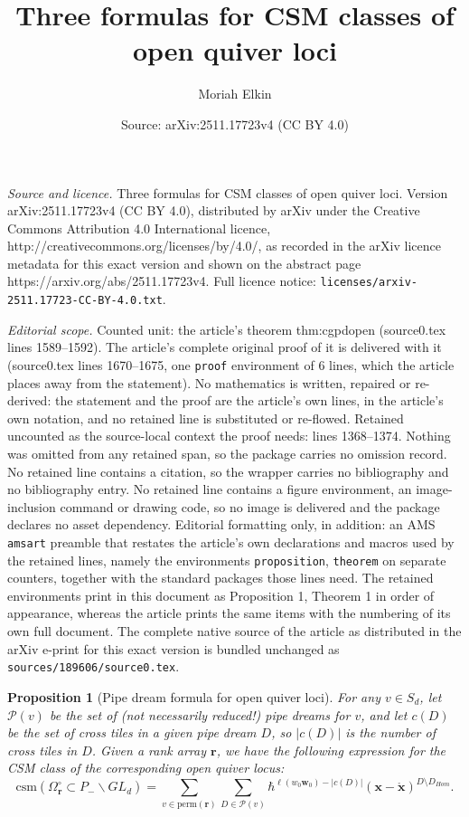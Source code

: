 \documentclass[10pt,a4paper]{amsart}
\title{Three formulas for CSM classes of open quiver loci}
\author{Moriah Elkin}
\date{Source: arXiv:2511.17723v4 (CC BY 4.0)}
\newtheorem{proposition}{Proposition}
\newcommand{\csm}{\textrm{csm}}
\newcommand{\perm}{\textrm{perm}}
\begin{document}
\maketitle

\noindent\emph{Source and licence.} Three formulas for CSM classes of open quiver loci. Version arXiv:2511.17723v4 (CC BY 4.0), distributed by arXiv under the Creative Commons Attribution 4.0 International licence, http://creativecommons.org/licenses/by/4.0/, as recorded in the arXiv licence metadata for this exact version and shown on the abstract page https://arxiv.org/abs/2511.17723v4. Full licence notice: \texttt{licenses/arxiv-2511.17723-CC-BY-4.0.txt}.\par\smallskip

\noindent\textit{Editorial scope.} Counted unit: the article's theorem thm:cgpdopen (source0.tex lines 1589--1592). The article's complete original proof of it is delivered with it (source0.tex lines 1670--1675, one \texttt{proof} environment of 6 lines, which the article places away from the statement). No mathematics is written, repaired or re-derived: the statement and the proof are the article's own lines, in the article's own notation, and no retained line is substituted or re-flowed.  Retained uncounted as the source-local context the proof needs: lines 1368--1374.  Nothing was omitted from any retained span, so the package carries no omission record.  No retained line contains a citation, so the wrapper carries no bibliography and no bibliography entry.  No retained line contains a figure environment, an image-inclusion command or drawing code, so no image is delivered and the package declares no asset dependency.  Editorial formatting only, in addition: an AMS \texttt{amsart} preamble that restates the article's own declarations and macros used by the retained lines, namely the environments \texttt{proposition}, \texttt{theorem} on separate counters, together with the standard packages those lines need.  The retained environments print in this document as Proposition 1, Theorem 1 in order of appearance, whereas the article prints the same items with the numbering of its own full document.  The complete native source of the article as distributed in the arXiv e-print for this exact version is bundled unchanged as \texttt{sources/189606/source0.tex}.
\begin{proposition}[Pipe dream formula for open quiver loci]\label{prop:pdopen}
For any $v \in S_d$, let $\mathcal{P}(v)$ be the set of (not necessarily reduced!) pipe dreams for $v$, and let $c(D)$ be the set of cross tiles in a given pipe dream $D$, so $|c(D)|$ is the number of cross tiles in $D$.
Given a rank array $\mathbf{r}$, we have the following expression for the CSM class of the corresponding open quiver locus:
\[\csm(\Omega_{\mathbf{r}}^\circ \subset P_- \backslash GL_d) =
\sum_{v \in \perm(\mathbf{r})} 
\sum_{D \in \mathcal{P}(v)} \hbar^{\ell(w_0\mathbf{w}_0)-|c(D)|}(\mathbf{x}-\mathring{\mathbf{x}})^{D\setminus D_{Hom}}.\]
\end{proposition}
\end{document}
